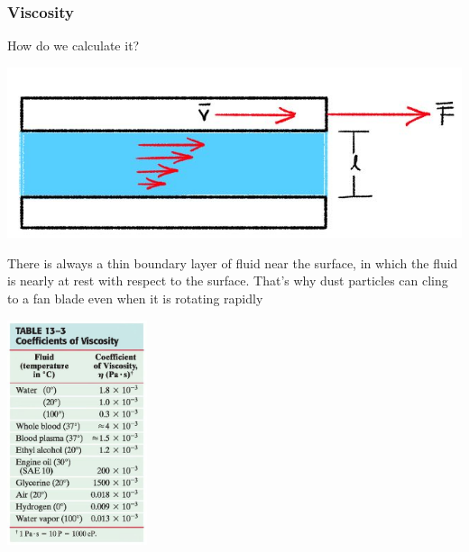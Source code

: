 \documentclass[]{beamer}
\begin{document}



\begin{frame}

  \frametitle{Viscosity}
  
  \textcolor{mypink1}{How do we calculate it?}

  
    \begin{center}
    \includegraphics[height=1.in]{images2/vicosity.jpg}
  \end{center}


  There
  is always a thin boundary layer of fluid near the surface, in which the fluid is
  nearly at rest with respect to the surface. That’s why dust particles can cling to a fan blade even when it is rotating rapidly
   \end{frame}




\begin{frame}




 \begin{center}
  \includegraphics[height=2.6in]{images2/viscosity.jpg}
\end{center}


 \end{frame}


\end{document}
